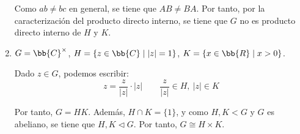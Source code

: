 \begin{ejercicio}
\begin{enumerate}
        Como $ab\neq bc$ en general, se tiene que $AB\neq BA$. Por tanto, por la caracterización del producto directo interno, se tiene que $G$ no es producto directo interno de $H$ y $K$.
        \item $G=\bb{C}^\times$, $H=\left\{z\in \bb{C}\mid |z|=1\right\}$, $K=\left\{x\in \bb{R}\mid x>0\right\}$.
        
        Dado $z\in G$, podemos escribir:
        \begin{equation*}
            z = \dfrac{z}{|z|}\cdot |z|\qquad \dfrac{z}{|z|}\in H,\ |z|\in K
        \end{equation*}

        Por tanto, $G=HK$. Además, $H\cap K=\{1\}$, y como $H,K<G$ y $G$ es abeliano, se tiene que $H,K\lhd G$. Por tanto, $G\cong H\times K$.
    \end{enumerate}
\end{ejercicio}

